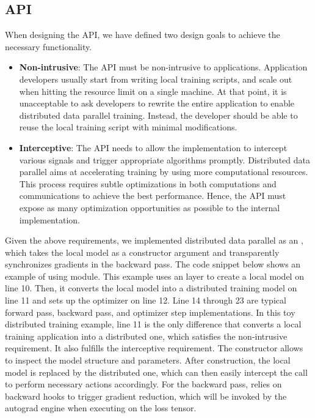 \subsection{API}\label{sec:api}

When designing the API, we have defined two design goals to achieve the necessary functionality.

\begin{itemize}
    \item \textbf{Non-intrusive}: The API must be non-intrusive to applications. Application developers usually start from writing local training scripts, and scale out when hitting the resource limit on a single machine. At that point, it is unacceptable to ask developers to rewrite the entire application to enable distributed data parallel training. Instead, the developer should be able to reuse the local training script with minimal modifications.
    \item \textbf{Interceptive}: The API needs to allow the implementation to intercept various signals and trigger appropriate algorithms promptly. Distributed data parallel aims at accelerating training by using more computational resources. This process requires subtle optimizations in both computations and communications to achieve the best performance. Hence, the API must expose as many optimization opportunities as possible to the internal implementation.
\end{itemize}

Given the above requirements, we implemented distributed data parallel as an , which takes the local model as a constructor argument and transparently synchronizes gradients in the backward pass. The code snippet below shows an example of using  module. This  example uses an  layer to create a local model on line 10. Then, it converts the local model into a distributed training model on line 11 and sets up the optimizer on line 12. Line 14 through 23 are typical forward pass, backward pass, and optimizer step implementations. In this toy distributed training example, line 11 is the only difference that converts a local training application into a distributed one, which satisfies the non-intrusive requirement. It also fulfills the interceptive requirement. The constructor allows  to inspect the model structure and parameters. After construction, the local model is replaced by the distributed one, which can then easily intercept the  call to perform necessary actions accordingly. For the backward pass,  relies on backward hooks to trigger gradient reduction, which will be invoked by the autograd engine when executing  on the loss tensor. 

